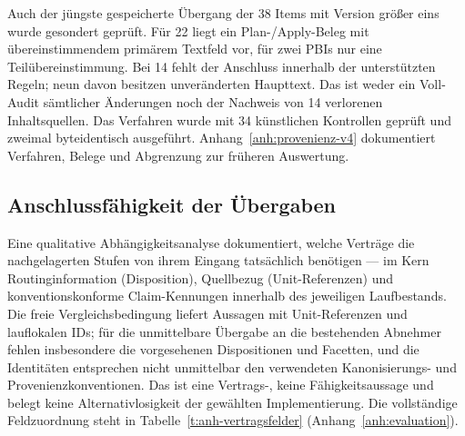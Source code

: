 Auch der jüngste gespeicherte Übergang der 38 Items mit Version
größer eins wurde gesondert geprüft. Für 22 liegt ein Plan-/Apply-Beleg
mit übereinstimmendem primärem Textfeld vor, für zwei PBIs nur eine
Teilübereinstimmung. Bei 14 fehlt der Anschluss innerhalb der
unterstützten Regeln; neun davon besitzen unveränderten Haupttext.
Das ist weder ein Voll-Audit sämtlicher Änderungen noch der Nachweis
von 14 verlorenen Inhaltsquellen. Das Verfahren wurde mit 34
künstlichen Kontrollen geprüft und zweimal byteidentisch ausgeführt.
Anhang~\ref{anh:provenienz-v4} dokumentiert Verfahren, Belege und
Abgrenzung zur früheren Auswertung.

\subsection{Anschlussfähigkeit der Übergaben}
\label{sec:eval-anschluss}

Eine qualitative Abhängigkeitsanalyse dokumentiert, welche
Verträge die nachgelagerten Stufen von ihrem Eingang tatsächlich
benötigen --- im Kern Routinginformation (Disposition),
Quellbezug (Unit-Referenzen) und konventionskonforme Claim-Kennungen
innerhalb des jeweiligen Laufbestands. Die freie
Vergleichsbedingung liefert Aussagen mit Unit-Referenzen und
lauflokalen IDs; für die unmittelbare Übergabe an die bestehenden
Abnehmer fehlen insbesondere die vorgesehenen Dispositionen und
Facetten, und die Identitäten entsprechen nicht unmittelbar den
verwendeten Kanonisierungs- und Provenienzkonventionen. Das ist
eine Vertrags-, keine Fähigkeitsaussage und belegt keine
Alternativlosigkeit der gewählten Implementierung. Die
vollständige Feldzuordnung steht in
Tabelle~\ref{t:anh-vertragsfelder}
(Anhang~\ref{anh:evaluation}).

